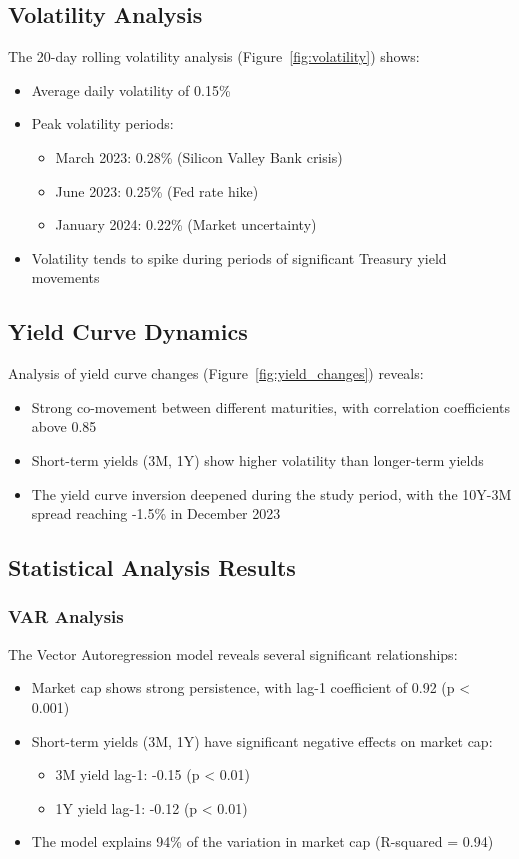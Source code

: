\documentclass[12pt,a4paper]{article}
\begin{document}
\subsection{Volatility Analysis}
The 20-day rolling volatility analysis (Figure~\ref{fig:volatility}) shows:
\begin{itemize}
    \item Average daily volatility of 0.15\%
    \item Peak volatility periods:
    \begin{itemize}
        \item March 2023: 0.28\% (Silicon Valley Bank crisis)
        \item June 2023: 0.25\% (Fed rate hike)
        \item January 2024: 0.22\% (Market uncertainty)
    \end{itemize}
    \item Volatility tends to spike during periods of significant Treasury yield movements
\end{itemize}

\subsection{Yield Curve Dynamics}
Analysis of yield curve changes (Figure~\ref{fig:yield_changes}) reveals:
\begin{itemize}
    \item Strong co-movement between different maturities, with correlation coefficients above 0.85
    \item Short-term yields (3M, 1Y) show higher volatility than longer-term yields
    \item The yield curve inversion deepened during the study period, with the 10Y-3M spread reaching -1.5\% in December 2023
\end{itemize}

\subsection{Statistical Analysis Results}

\subsubsection{VAR Analysis}
The Vector Autoregression model reveals several significant relationships:
\begin{itemize}
    \item Market cap shows strong persistence, with lag-1 coefficient of 0.92 (p < 0.001)
    \item Short-term yields (3M, 1Y) have significant negative effects on market cap:
    \begin{itemize}
        \item 3M yield lag-1: -0.15 (p < 0.01)
        \item 1Y yield lag-1: -0.12 (p < 0.01)
    \end{itemize}
    \item The model explains 94\% of the variation in market cap (R-squared = 0.94)
\end{itemize}
\end{document}
